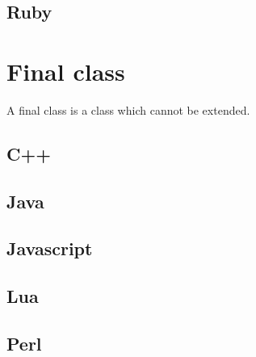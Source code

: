 \documentclass{KodeBook}
\begin{document}
\subsection{Ruby}



\section{Final class}

A final class is a class which cannot be extended. 

\subsection{C++}


\subsection{Java}


\subsection{Javascript} 


\subsection{Lua}


\subsection{Perl}

\end{document}
